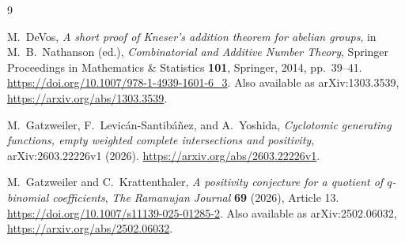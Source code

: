 \documentclass[11pt]{article}
\theoremstyle{definition}
\theoremstyle{remark}
\begin{document}
\begin{thebibliography}{9}

M.~DeVos,
\emph{A short proof of Kneser's addition theorem for abelian groups},
in M.~B.~Nathanson (ed.), \emph{Combinatorial and Additive Number Theory},
Springer Proceedings in Mathematics \& Statistics \textbf{101},
Springer, 2014, pp.~39--41.
\url{https://doi.org/10.1007/978-1-4939-1601-6_3}.
Also available as arXiv:1303.3539,
\url{https://arxiv.org/abs/1303.3539}.

M.~Gatzweiler, F.~Levic\'an-Santib\'a\~nez, and A.~Yoshida,
\emph{Cyclotomic generating functions, empty weighted complete
intersections and positivity},
arXiv:2603.22226v1 (2026).
\url{https://arxiv.org/abs/2603.22226v1}.

M.~Gatzweiler and C.~Krattenthaler,
\emph{A positivity conjecture for a quotient of $q$-binomial coefficients},
\emph{The Ramanujan Journal} \textbf{69} (2026), Article 13.
\url{https://doi.org/10.1007/s11139-025-01285-2}.
Also available as arXiv:2502.06032,
\url{https://arxiv.org/abs/2502.06032}.

\end{thebibliography}
\end{document}
